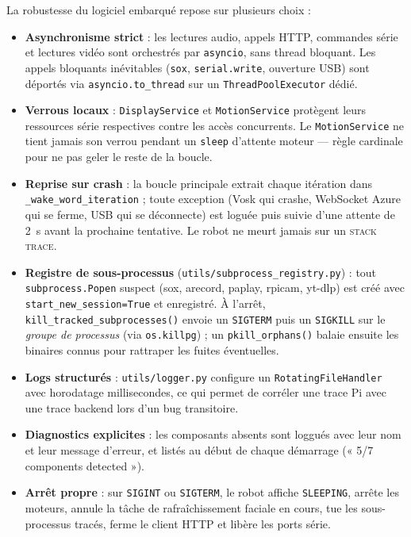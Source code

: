 \documentclass[a4paper,12pt]{report}
\begin{document}
	La robustesse du logiciel embarqué repose sur plusieurs choix :
	\begin{itemize}
		\item \textbf{Asynchronisme strict} : les lectures audio, appels HTTP,
		commandes série et lectures vidéo sont orchestrés par
		\texttt{asyncio}, sans thread bloquant. Les appels bloquants
		inévitables (\texttt{sox}, \texttt{serial.write}, ouverture USB) sont
		déportés via \texttt{asyncio.to\_thread} sur un
		\texttt{ThreadPoolExecutor} dédié.
		\item \textbf{Verrous locaux} : \texttt{DisplayService} et
		\texttt{MotionService} protègent leurs ressources série respectives
		contre les accès concurrents. Le \texttt{MotionService} ne tient jamais
		son verrou pendant un \texttt{sleep} d'attente moteur — règle
		cardinale pour ne pas geler le reste de la boucle.
		\item \textbf{Reprise sur crash} : la boucle principale extrait chaque
		itération dans \texttt{\_wake\_word\_iteration} ; toute exception (Vosk
		qui crashe, WebSocket Azure qui se ferme, USB qui se déconnecte) est
		loguée puis suivie d'une attente de 2~s avant la prochaine tentative.
		Le robot ne meurt jamais sur un \textsc{stack trace}.
		\item \textbf{Registre de sous-processus}
		(\texttt{utils/subprocess\_registry.py}) : tout
		\texttt{subprocess.Popen} suspect (sox, arecord, paplay, rpicam,
		yt-dlp) est créé avec \texttt{start\_new\_session=True} et enregistré.
		À l'arrêt, \texttt{kill\_tracked\_subprocesses()} envoie un
		\texttt{SIGTERM} puis un \texttt{SIGKILL} sur le \emph{groupe de
		processus} (via \texttt{os.killpg}) ; un \texttt{pkill\_orphans()}
		balaie ensuite les binaires connus pour rattraper les fuites
		éventuelles.
		\item \textbf{Logs structurés} : \texttt{utils/logger.py} configure un
		\texttt{RotatingFileHandler} avec horodatage millisecondes, ce qui
		permet de corréler une trace Pi avec une trace backend lors d'un bug
		transitoire.
		\item \textbf{Diagnostics explicites} : les composants absents sont
		loggués avec leur nom et leur message d'erreur, et listés au début de
		chaque démarrage (« 5/7 components detected »).
		\item \textbf{Arrêt propre} : sur \texttt{SIGINT} ou \texttt{SIGTERM},
		le robot affiche \texttt{SLEEPING}, arrête les moteurs, annule la
		tâche de rafraîchissement faciale en cours, tue les sous-processus
		tracés, ferme le client HTTP et libère les ports série.
	\end{itemize}
	
\end{document}

